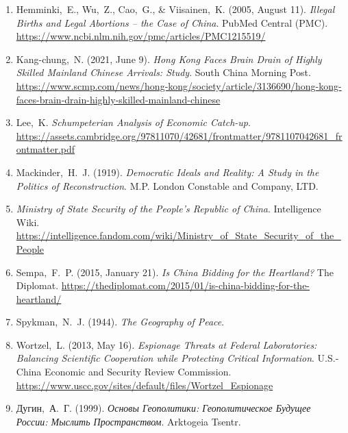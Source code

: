\documentclass[12pt]{article}
\begin{document}
\begin{enumerate}
  \item Hemminki, E., Wu, Z., Cao, G., & Viisainen, K. (2005, August 11). \textit{Illegal Births and Legal Abortions – the Case of China}. PubMed Central (PMC).\\ \href{https://www.ncbi.nlm.nih.gov/pmc/articles/PMC1215519/}{https://www.ncbi.nlm.nih.gov/pmc/articles/PMC1215519/}

  \item Kang-chung, N. (2021, June 9). \textit{Hong Kong Faces Brain Drain of Highly Skilled Mainland Chinese Arrivals: Study}. South China Morning Post. \href{https://www.scmp.com/news/hong-kong/society/article/3136690/hong-kong-faces-brain-drain-highly-skilled-mainland-chinese}{https://www.scmp.com/news/hong-kong/society/article/3136690/hong-kong-faces-brain-drain-highly-skilled-mainland-chinese}

  \item Lee, K. \textit{Schumpeterian Analysis of Economic Catch-up}.\\ \href{https://assets.cambridge.org/97811070/42681/frontmatter/9781107042681\_frontmatter.pdf}{https://assets.cambridge.org/97811070/42681/frontmatter/9781107042681\_frontmatter.pdf}

  \item Mackinder, H. J. (1919). \textit{Democratic Ideals and Reality: A Study in the Politics of Reconstruction}. M.P. London Constable and Company, LTD.

  \item \textit{Ministry of State Security of the People's Republic of China}. Intelligence Wiki. \\\href{https://intelligence.fandom.com/wiki/Ministry\_of\_State\_Security\_of\_the\_People\%27s\_Republic\_of\_China}{https://intelligence.fandom.com/wiki/Ministry\_of\_State\_Security\_of\_the\_People}

  \item Sempa, F. P. (2015, January 21). \textit{Is China Bidding for the Heartland?} The Diplomat. \href{https://thediplomat.com/2015/01/is-china-bidding-for-the-heartland/}{https://thediplomat.com/2015/01/is-china-bidding-for-the-heartland/}

  \item Spykman, N. J. (1944). \textit{The Geography of Peace}.

  \item Wortzel, L. (2013, May 16). \textit{Espionage Threats at Federal Laboratories: Balancing Scientific Cooperation while Protecting Critical Information}. U.S.-China Economic and Security Review Commission. \\\href{https://www.uscc.gov/sites/default/files/Wortzel\_Espionage\%20Threat\%20at\%20Federal\%20Laboratories05.16.13.pdf}{https://www.uscc.gov/sites/default/files/Wortzel\_Espionage}

  \item {}Дугин, А. Г. (1999). \textit{Основы Геополитики: Геополитическое Будущее России: Мыслить Пространством}. Arktogeia Tsentr.

\end{enumerate}
\end{document}
